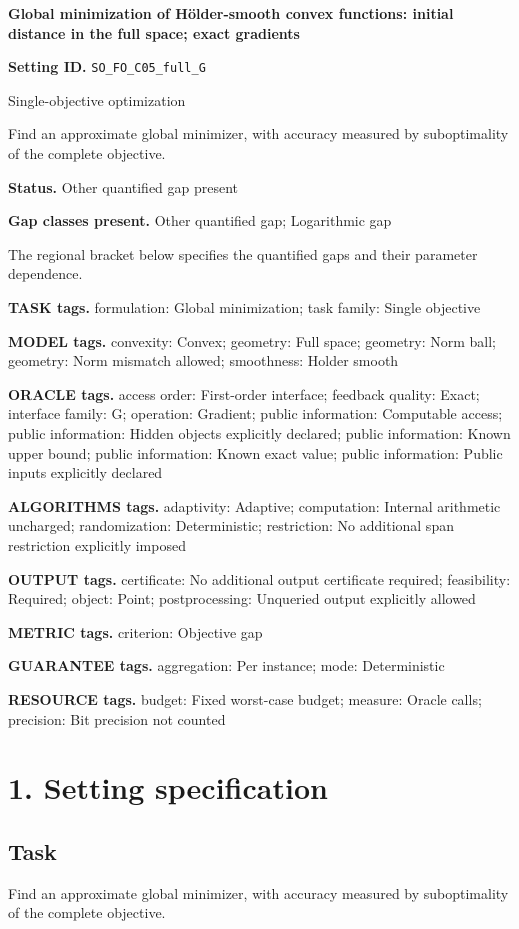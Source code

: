 \documentclass[10pt,a4paper]{article}
\begin{document}
\raggedright

{\LARGE\bfseries\sffamily\color{AtlasNavy} Global minimization of Hölder-smooth convex functions: initial distance in the full space; exact gradients\par}\vspace{5pt}
\textbf{Setting ID.} \texttt{SO\_\allowbreak{}FO\_\allowbreak{}C05\_\allowbreak{}full\_\allowbreak{}G}

Single-objective optimization

Find an approximate global minimizer, with accuracy measured by suboptimality of the complete objective.

\textbf{Status.} Other quantified gap present

\textbf{Gap classes present.} Other quantified gap; Logarithmic gap

The regional bracket below specifies the quantified gaps and their parameter dependence.

\textbf{TASK tags.} formulation: Global minimization; task family: Single objective

\textbf{MODEL tags.} convexity: Convex; geometry: Full space; geometry: Norm ball; geometry: Norm mismatch allowed; smoothness: Holder smooth

\textbf{ORACLE tags.} access order: First-order interface; feedback quality: Exact; interface family: G; operation: Gradient; public information: Computable access; public information: Hidden objects explicitly declared; public information: Known upper bound; public information: Known exact value; public information: Public inputs explicitly declared

\textbf{ALGORITHMS tags.} adaptivity: Adaptive; computation: Internal arithmetic uncharged; randomization: Deterministic; restriction: No additional span restriction explicitly imposed

\textbf{OUTPUT tags.} certificate: No additional output certificate required; feasibility: Required; object: Point; postprocessing: Unqueried output explicitly allowed

\textbf{METRIC tags.} criterion: Objective gap

\textbf{GUARANTEE tags.} aggregation: Per instance; mode: Deterministic

\textbf{RESOURCE tags.} budget: Fixed worst-case budget; measure: Oracle calls; precision: Bit precision not counted

\section{1. Setting specification}
\subsection{Task}
Find an approximate global minimizer, with accuracy measured by suboptimality of the complete objective.
\end{document}
